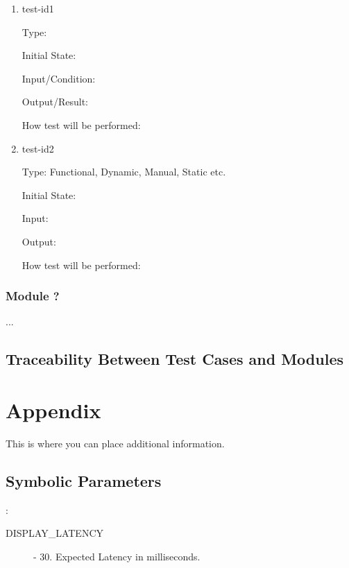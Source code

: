 \documentclass[12pt, titlepage]{article}
\begin{document}
\begin{enumerate}

\item{test-id1\\}

Type: 

Initial State:

Input/Condition:

Output/Result:

How test will be performed:

\item{test-id2\\}

Type: Functional, Dynamic, Manual, Static etc.

Initial State:

Input:

Output:

How test will be performed:

\end{enumerate}

\subsubsection{Module ?}

...

\subsection{Traceability Between Test Cases and Modules}






\newpage

\section{Appendix}

This is where you can place additional information.

\subsection{Symbolic Parameters}

: 
\begin{description}
  \item[DISPLAY\_LATENCY] - 30. Expected Latency in milliseconds. 
\end{description}
\end{document}
